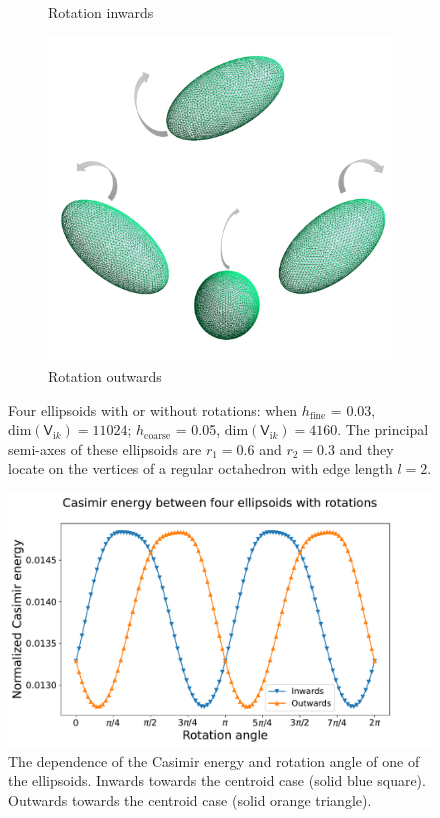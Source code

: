 \begin{figure}[H]
\begin{subfigure}{.5\linewidth}
    \caption{Rotation inwards}
    \label{Rotation inwards 4}
    \end{subfigure}%
    \begin{subfigure}{.5\linewidth}
    \centering
    \includegraphics[scale = 0.4]{figures/4_ellip_out}
    \caption{Rotation outwards}
    \label{Rotation outwards 4}
    \end{subfigure}
    \caption{Four ellipsoids with or without rotations:  when $h_\text{fine}$ = 0.03, $\text{dim}(\mathsf{V}_{\mathrm{i}k}) = 11024$; 
    $h_\text{coarse}$ = 0.05, $\text{dim}(\mathsf{V}_{\mathrm{i}k}) = 4160$. The principal semi-axes of these ellipsoids are $r_{1} = 0.6$ and $r_{2} = 0.3$
    and they locate on the vertices of a regular octahedron with edge length $l = 2$.}
    \label{Four ellipsoids with or without rotations}
    \end{figure}

    \begin{figure}[H]
        \centering
        \includegraphics[scale = 0.5]{figures/CasE_4_ellip.pdf}
        \caption{The dependence of the Casimir energy and rotation angle of one of the ellipsoids. Inwards towards the centroid case (solid blue square).
        Outwards towards the centroid case (solid orange triangle).}
        \label{Four ellipsoids}
    \end{figure}

